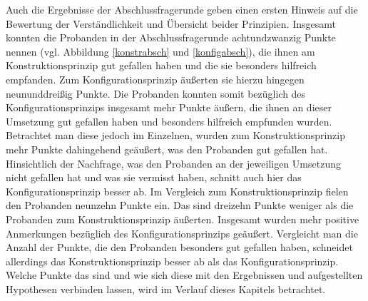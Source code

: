 Auch die Ergebnisse der Abschlussfragerunde geben einen ersten Hinweis auf die Bewertung der Verständlichkeit und Übersicht beider Prinzipien. Insgesamt konnten die Probanden in der Abschlussfragerunde achtundzwanzig Punkte nennen (vgl. Abbildung \ref{konstrabsch} und \ref{konfigabsch}), die ihnen am Konstruktionsprinzip gut gefallen haben und die sie besonders hilfreich empfanden. Zum Konfigurationsprinzip äußerten sie hierzu hingegen neununddreißig Punkte. Die Probanden konnten somit bezüglich des Konfigurationsprinzips insgesamt mehr Punkte äußern, die ihnen an dieser Umsetzung gut gefallen haben und besonders hilfreich empfunden wurden. Betrachtet man diese jedoch im Einzelnen, wurden zum Konstruktionsprinzip mehr Punkte dahingehend geäußert, was den Probanden gut gefallen hat. Hinsichtlich der Nachfrage, was den Probanden an der jeweiligen Umsetzung nicht gefallen hat und was sie vermisst haben, schnitt auch hier das Konfigurationsprinzip besser ab. Im Vergleich zum Konstruktionsprinzip fielen den Probanden neunzehn Punkte ein. Das sind dreizehn Punkte weniger als die Probanden zum Konstruktionsprinzip äußerten. Insgesamt wurden mehr positive Anmerkungen bezüglich des Konfigurationsprinzips geäußert. Vergleicht man die Anzahl der Punkte, die den Probanden besonders gut gefallen haben, schneidet allerdings das Konstruktionsprinzip besser ab als das Konfigurationsprinzip. Welche Punkte das sind und wie sich diese mit den Ergebnissen und aufgestellten Hypothesen verbinden lassen, wird im Verlauf dieses Kapitels betrachtet.


